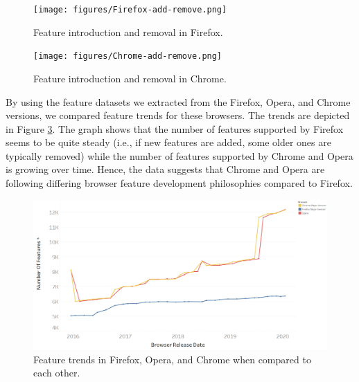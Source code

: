 \begin{figure}[ht]
    \centering
    \texttt{[image: figures/Firefox-add-remove.png]}
    \caption{Feature introduction and removal in Firefox.}
    \label{fig:ffaddremove}
\end{figure}

\begin{figure}[ht]
    \centering
    \texttt{[image: figures/Chrome-add-remove.png]}
    \caption{Feature introduction and removal in Chrome.}
    \label{fig:chaddremove}
\end{figure}

By using the feature datasets we extracted from the Firefox, Opera, and Chrome
versions, we compared feature trends for these browsers. The trends are
depicted in Figure \ref{fig:featuretrends}. The graph shows that the
  number of features supported by Firefox seems to be quite steady
  (i.e., if new features are added, some older ones are typically
  removed) while the number of features supported by Chrome and Opera is growing
  over time. Hence, the data suggests that Chrome and Opera are
  following differing browser feature development philosophies compared to Firefox.

\begin{figure}[ht]
    \centering
    \includegraphics[width=\columnwidth]{figures/Feature-Trends.PNG}
    \caption{Feature trends in Firefox, Opera, and Chrome when compared to
      each other.}
    \label{fig:featuretrends}
\end{figure}
